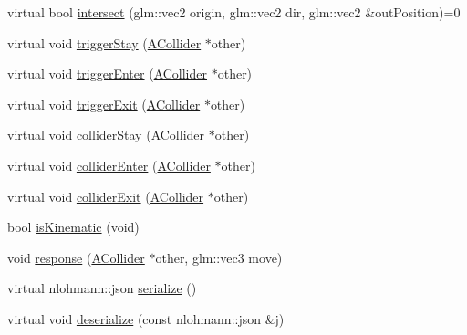 \begin{DoxyCompactItemize}
virtual bool \mbox{\hyperlink{class_beer_engine_1_1_component_1_1_a_collider_a2ffff777d86ac72aee0c0586ab651db8}{intersect}} (glm\+::vec2 origin, glm\+::vec2 dir, glm\+::vec2 \&out\+Position)=0
\item 
virtual void \mbox{\hyperlink{class_beer_engine_1_1_component_1_1_a_collider_a789bd29ac268dce4e8c62158fe0fa6f2}{trigger\+Stay}} (\mbox{\hyperlink{class_beer_engine_1_1_component_1_1_a_collider}{A\+Collider}} $\ast$other)
\item 
virtual void \mbox{\hyperlink{class_beer_engine_1_1_component_1_1_a_collider_a9ae412a0e4650848a0ce539aa05b1c6a}{trigger\+Enter}} (\mbox{\hyperlink{class_beer_engine_1_1_component_1_1_a_collider}{A\+Collider}} $\ast$other)
\item 
virtual void \mbox{\hyperlink{class_beer_engine_1_1_component_1_1_a_collider_aef3fe6dd09a0959ab496f2eaaa5d0491}{trigger\+Exit}} (\mbox{\hyperlink{class_beer_engine_1_1_component_1_1_a_collider}{A\+Collider}} $\ast$other)
\item 
virtual void \mbox{\hyperlink{class_beer_engine_1_1_component_1_1_a_collider_a6407be22d828a4515dd16bb3c552f36d}{collider\+Stay}} (\mbox{\hyperlink{class_beer_engine_1_1_component_1_1_a_collider}{A\+Collider}} $\ast$other)
\item 
virtual void \mbox{\hyperlink{class_beer_engine_1_1_component_1_1_a_collider_afa37b41af82346916f1f4f6d0956d2c0}{collider\+Enter}} (\mbox{\hyperlink{class_beer_engine_1_1_component_1_1_a_collider}{A\+Collider}} $\ast$other)
\item 
virtual void \mbox{\hyperlink{class_beer_engine_1_1_component_1_1_a_collider_a6446f7f796c3a7f619c7c1ef774502b7}{collider\+Exit}} (\mbox{\hyperlink{class_beer_engine_1_1_component_1_1_a_collider}{A\+Collider}} $\ast$other)
\item 
bool \mbox{\hyperlink{class_beer_engine_1_1_component_1_1_a_collider_aee0827674c1f742a1a5ee119f692d7a2}{is\+Kinematic}} (void)
\item 
void \mbox{\hyperlink{class_beer_engine_1_1_component_1_1_a_collider_ac0882500e46a05bb646b23394407c769}{response}} (\mbox{\hyperlink{class_beer_engine_1_1_component_1_1_a_collider}{A\+Collider}} $\ast$other, glm\+::vec3 move)
\item 
virtual nlohmann\+::json \mbox{\hyperlink{class_beer_engine_1_1_component_1_1_a_collider_aecc5eb364d52beede07428ba1b668e09}{serialize}} ()
\item 
virtual void \mbox{\hyperlink{class_beer_engine_1_1_component_1_1_a_collider_ac6bad21e0cfe7f95c431b9a7a59c550c}{deserialize}} (const nlohmann\+::json \&j)
\end{DoxyCompactItemize}
